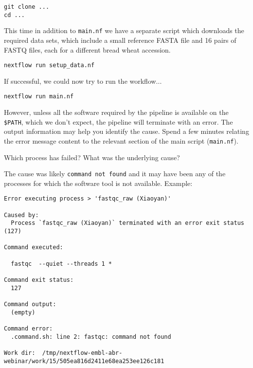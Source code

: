 \begin{steps}
\begin{lstlisting}[basicstyle=\ttfamily]
git clone ...
cd ...
\end{lstlisting}

This time in addition to \texttt{main.nf} we have a separate script which downloads the required data sets, which include a small reference FASTA file and 16 pairs of FASTQ files, each for a different bread wheat accession.


\begin{lstlisting}
nextflow run setup_data.nf
\end{lstlisting}

If successful, we could now try to run the workflow...

\begin{lstlisting}
nextflow run main.nf

\end{lstlisting}
However, unless all the software required by the pipeline is available on the \texttt{\$PATH},
which we don't expect, the pipeline will terminate with an error.
The output information may help you identify the cause. 
Spend a few minutes relating the error message content to the relevant section of the main script (\texttt{main.nf}). 
\end{steps}

\begin{questions}
Which process has failed?
What was the underlying cause?
\begin{answer}
The cause was likely \texttt{command not found} and it may have been any of the processes for which the software tool is not available.
Example:
\begin{lstlisting}
Error executing process > 'fastqc_raw (Xiaoyan)'

Caused by:
  Process `fastqc_raw (Xiaoyan)` terminated with an error exit status (127)

Command executed:

  fastqc  --quiet --threads 1 *

Command exit status:
  127

Command output:
  (empty)

Command error:
  .command.sh: line 2: fastqc: command not found

Work dir:  /tmp/nextflow-embl-abr-webinar/work/15/505ea816d2411e68ea253ee126c181
\end{lstlisting}
\end{answer}
\end{questions}


